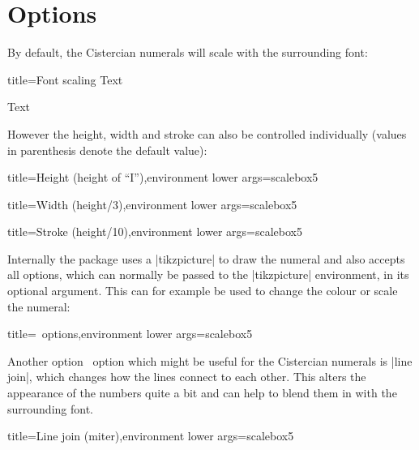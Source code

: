 \documentclass{scrartcl}
\begin{document}
\section{Options}

By default, the Cistercian numerals will scale with the surrounding font:
\begin{tcblisting}{title={Font scaling}}
 Text

\Huge {} Text
\end{tcblisting}

However the height, width and stroke can also be controlled individually (values in parenthesis denote the default value):
\begin{tcblisting}{title={Height (height of ``I'')},environment lower args={scalebox}{5}}
\end{tcblisting}
\begin{tcblisting}{title={Width (height/3)},environment lower args={scalebox}{5}}
\end{tcblisting}
\begin{tcblisting}{title={Stroke (height/10)},environment lower args={scalebox}{5}}
\end{tcblisting}

Internally the package uses a \saminline|tikzpicture| to draw the numeral and also accepts all options, which can normally be passed to the \saminline|tikzpicture| environment, in its optional argument. This can for example be used to change the colour or scale the numeral:
\begin{tcblisting}{title={\TikZ\ options},environment lower args={scalebox}{5}}
\end{tcblisting}

Another option \TikZ\ option which might be useful for the Cistercian numerals is \saminline|line join|, which changes how the lines connect to each other. This alters the appearance of the numbers quite a bit and can help to blend them in with the surrounding font.
\begin{tcblisting}{title={Line join (miter)},environment lower args={scalebox}{5}}
\end{tcblisting}

%
\end{document}
